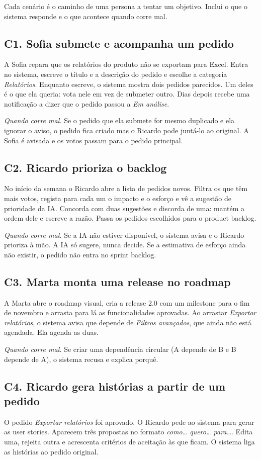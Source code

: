 \documentclass[12pt,a4paper]{article}
\begin{document}
Cada cenário é o caminho de uma persona a tentar um objetivo. Inclui o que o sistema responde e o que acontece quando corre mal.

\subsection{C1. Sofia submete e acompanha um pedido}
A Sofia repara que os relatórios do produto não se exportam para Excel. Entra no sistema, escreve o título e a descrição do pedido e escolhe a categoria \textit{Relatórios}. Enquanto escreve, o sistema mostra dois pedidos parecidos. Um deles é o que ela queria: vota nele em vez de submeter outro. Dias depois recebe uma notificação a dizer que o pedido passou a \textit{Em análise}.

\textit{Quando corre mal.} Se o pedido que ela submete for mesmo duplicado e ela ignorar o aviso, o pedido fica criado mas o Ricardo pode juntá-lo ao original. A Sofia é avisada e os votos passam para o pedido principal.

\subsection{C2. Ricardo prioriza o backlog}
No início da semana o Ricardo abre a lista de pedidos novos. Filtra os que têm mais votos, regista para cada um o impacto e o esforço e vê a sugestão de prioridade da IA. Concorda com duas sugestões e discorda de uma: mantém a ordem dele e escreve a razão. Passa os pedidos escolhidos para o product backlog.

\textit{Quando corre mal.} Se a IA não estiver disponível, o sistema avisa e o Ricardo prioriza à mão. A IA só sugere, nunca decide. Se a estimativa de esforço ainda não existir, o pedido não entra no sprint backlog.

\subsection{C3. Marta monta uma release no roadmap}
A Marta abre o roadmap visual, cria a release 2.0 com um milestone para o fim de novembro e arrasta para lá as funcionalidades aprovadas. Ao arrastar \textit{Exportar relatórios}, o sistema avisa que depende de \textit{Filtros avançados}, que ainda não está agendada. Ela agenda as duas.

\textit{Quando corre mal.} Se criar uma dependência circular (A depende de B e B depende de A), o sistema recusa e explica porquê.

\subsection{C4. Ricardo gera histórias a partir de um pedido}
O pedido \textit{Exportar relatórios} foi aprovado. O Ricardo pede ao sistema para gerar as user stories. Aparecem três propostas no formato \textit{como\ldots{} quero\ldots{} para\ldots}. Edita uma, rejeita outra e acrescenta critérios de aceitação às que ficam. O sistema liga as histórias ao pedido original.
\end{document}

